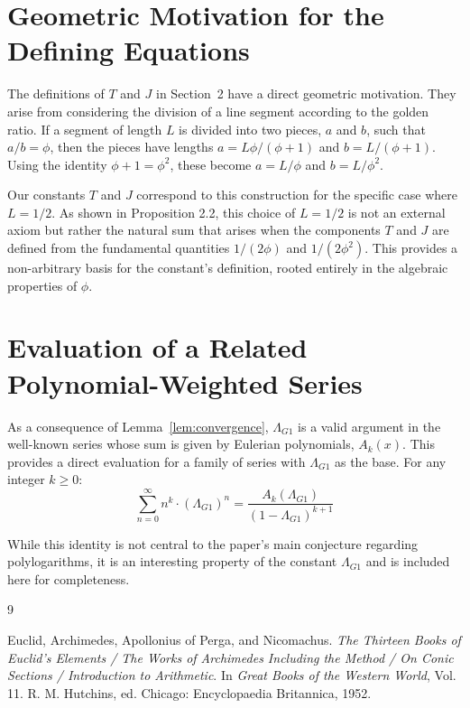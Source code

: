 \documentclass{amsart}
\theoremstyle{plain}
\theoremstyle{definition}
\theoremstyle{remark}
\newcommand{\LambdaG}{\Lambda_{G1}}
\begin{document}
\appendix
\section{Geometric Motivation for the Defining Equations}
\label{app:A}
The definitions of $T$ and $J$ in Section~2 have a direct geometric motivation. They arise from considering the division of a line segment according to the golden ratio. If a segment of length $L$ is divided into two pieces, $a$ and $b$, such that $a/b = \phi$, then the pieces have lengths $a = L\phi/(\phi+1)$ and $b=L/(\phi+1)$. Using the identity $\phi+1=\phi^2$, these become $a=L/\phi$ and $b=L/\phi^2$.

Our constants $T$ and $J$ correspond to this construction for the specific case where $L=1/2$. As shown in Proposition 2.2, this choice of $L=1/2$ is not an external axiom but rather the natural sum that arises when the components $T$ and $J$ are defined from the fundamental quantities $1/(2\phi)$ and $1/(2\phi^2)$. This provides a non-arbitrary basis for the constant's definition, rooted entirely in the algebraic properties of $\phi$.

\section{Evaluation of a Related Polynomial-Weighted Series}
As a consequence of Lemma~\ref{lem:convergence}, $\LambdaG$ is a valid argument in the well-known series whose sum is given by Eulerian polynomials, $A_k(x)$. This provides a direct evaluation for a family of series with $\LambdaG$ as the base. For any integer $k \ge 0$:
$$ \sum_{n=0}^{\infty} n^k \cdot (\LambdaG)^n = \frac{A_k(\LambdaG)}{(1-\LambdaG)^{k+1}} $$

While this identity is not central to the paper's main conjecture regarding polylogarithms, it is an interesting property of the constant $\LambdaG$ and is included here for completeness.

\begin{thebibliography}{9}

Euclid, Archimedes, Apollonius of Perga, and Nicomachus. 
\textit{The Thirteen Books of Euclid's Elements / The Works of Archimedes Including the Method / On Conic Sections / Introduction to Arithmetic}. 
In \textit{Great Books of the Western World}, Vol. 11. R. M. Hutchins, ed. Chicago: Encyclopaedia Britannica, 1952.

\end{thebibliography}
\end{document}
